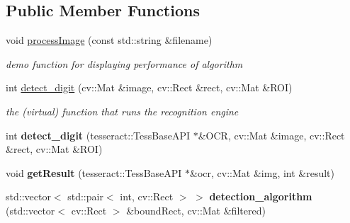 \subsection*{Public Member Functions}
\begin{DoxyCompactItemize}
\item 
\mbox{\label{class_optical___character___recognition_ac94cc464313af1a3ad1c66a508826844}} 
void \mbox{\hyperlink{class_optical___character___recognition_ac94cc464313af1a3ad1c66a508826844}{process\+Image}} (const std\+::string \&filename)
\begin{DoxyCompactList}\small\item\em demo function for displaying performance of algorithm \end{DoxyCompactList}\item 
\mbox{\label{class_optical___character___recognition_a46af55e1f0a92cc025b8fdc5a48be671}} 
int \mbox{\hyperlink{class_optical___character___recognition_a46af55e1f0a92cc025b8fdc5a48be671}{detect\+\_\+digit}} (cv\+::\+Mat \&image, cv\+::\+Rect \&rect, cv\+::\+Mat \&R\+OI)
\begin{DoxyCompactList}\small\item\em the (virtual) function that runs the recognition engine \end{DoxyCompactList}\item 
\mbox{\label{class_optical___character___recognition_a7bd6b6526dd287611d8bf1cd3a157796}} 
int {\bfseries detect\+\_\+digit} (tesseract\+::\+Tess\+Base\+A\+PI $\ast$\&O\+CR, cv\+::\+Mat \&image, cv\+::\+Rect \&rect, cv\+::\+Mat \&R\+OI)
\item 
\mbox{\label{class_optical___character___recognition_a206d7717fa04e0b46564f56fe0c27479}} 
void {\bfseries get\+Result} (tesseract\+::\+Tess\+Base\+A\+PI $\ast$\&ocr, cv\+::\+Mat \&img, int \&result)
\item 
\mbox{\label{class_optical___character___recognition_a011e000a7288f133cdf99cee0c31657a}} 
std\+::vector$<$ std\+::pair$<$ int, cv\+::\+Rect $>$ $>$ {\bfseries detection\+\_\+algorithm} (std\+::vector$<$ cv\+::\+Rect $>$ \&bound\+Rect, cv\+::\+Mat \&filtered)
\end{DoxyCompactItemize}
